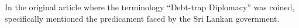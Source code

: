 In the original article where the terminology ``Debt-trap Diplomacy'' was coined, \citeauthor{Chellaney_2017} specifically mentioned the predicament faced by the Sri Lankan government.

\citep*{Moramudali_2020}